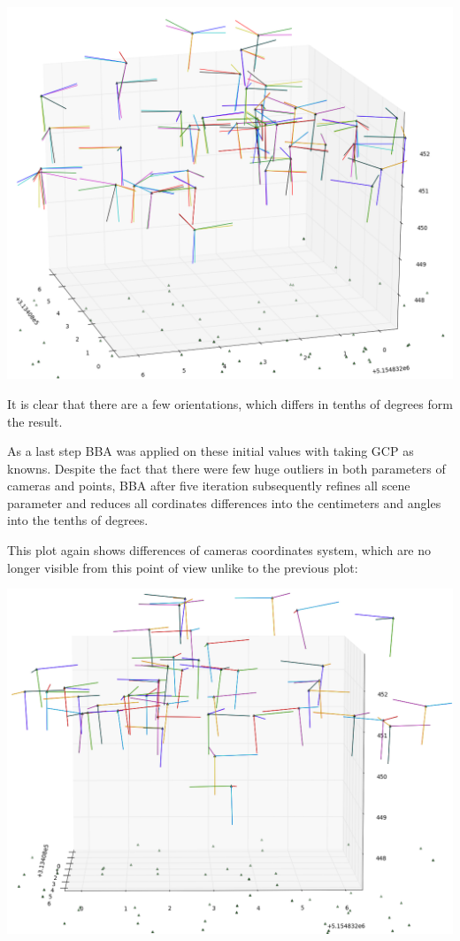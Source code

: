 \documentclass[a4paper,12pt]{article}
\begin{document}
\includegraphics[scale=0.4]{figures/angles_comaprison_relative_orinetaion.png}

It is clear that there are a few orientations, which differs in tenths of degrees form the result. 

As a last step BBA was applied on these initial values with taking GCP as knowns.
Despite the fact that there were few huge outliers in both parameters of cameras and points,
BBA after five iteration subsequently refines all scene parameter and reduces all cordinates 
differences into the centimeters and angles into the tenths of degrees. 


This plot again shows differences of cameras coordinates system, which are no longer visible from this point of view
unlike to the previous plot:

\includegraphics[scale=0.4]{figures/result.png}
\end{document}
